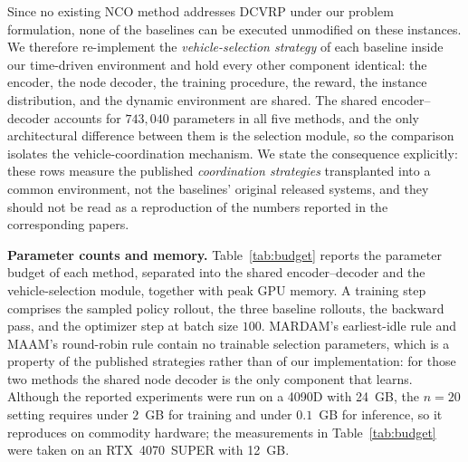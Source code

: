 
Since no existing NCO method addresses DCVRP under our problem formulation, none
of the baselines can be executed unmodified on these instances. We therefore
re-implement the \emph{vehicle-selection strategy} of each baseline inside our
time-driven environment and hold every other component identical: the encoder,
the node decoder, the training procedure, the reward, the instance
distribution, and the dynamic environment are shared. The shared
encoder--decoder accounts for $743{,}040$ parameters in all five methods, and
the only architectural difference between them is the selection module, so the
comparison isolates the vehicle-coordination mechanism. We state the
consequence explicitly: these rows measure the published \emph{coordination
strategies} transplanted into a common environment, not the baselines' original
released systems, and they should not be read as a reproduction of the numbers
reported in the corresponding papers.



\textbf{Parameter counts and memory.} Table~\ref{tab:budget} reports the
parameter budget of each method, separated into the shared encoder--decoder and
the vehicle-selection module, together with peak GPU memory. A training step
comprises the sampled policy rollout, the three baseline rollouts, the backward
pass, and the optimizer step at batch size $100$. MARDAM's earliest-idle rule
and MAAM's round-robin rule contain no trainable selection parameters, which is
a property of the published strategies rather than of our implementation: for
those two methods the shared node decoder is the only component that learns.
Although the reported experiments were run on a 4090D with 24~GB, the $n=20$
setting requires under $2$~GB for training and under $0.1$~GB for inference, so
it reproduces on commodity hardware; the measurements in
Table~\ref{tab:budget} were taken on an RTX~4070~SUPER with 12~GB.

